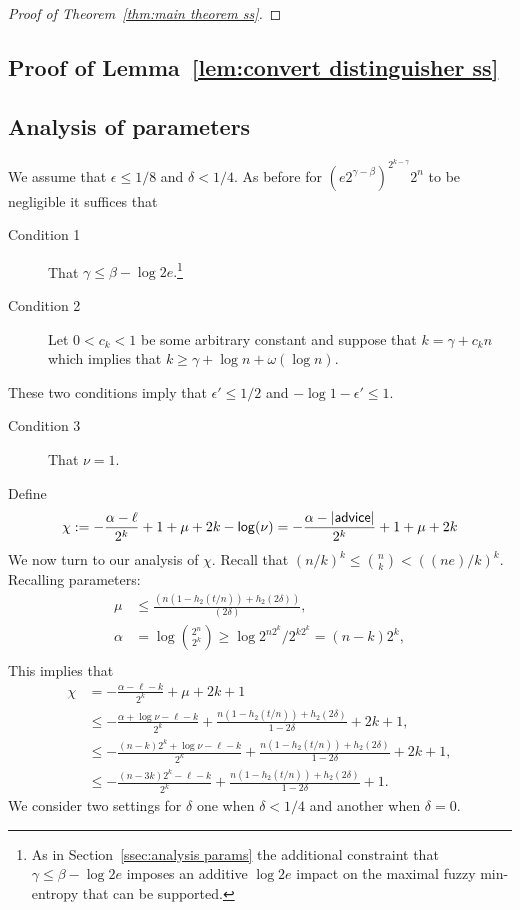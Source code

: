 \begin{proof}[Proof of Theorem~\ref{thm:main theorem ss}]
\end{proof}


\subsection{Proof of Lemma~\ref{lem:convert distinguisher ss}}
\label{ssec:ss proof}


\subsection{Analysis of parameters}
We assume that $\epsilon\le 1/8$ and $\delta<1/4$.  As before for  
$
\left(e2^{\gamma-\beta}\right)^{2^{k-\gamma}}2^n$ to be negligible it suffices that
\begin{description}
\item[Condition 1] That $\gamma \le \beta-\log{2e}.$\footnote{As in Section~\ref{ssec:analysis params} the additional constraint that 
$
\gamma \le \beta - \log{2e}$ 
imposes an additive $\log{2e}$ impact on the maximal fuzzy min-entropy that can be supported. 
}
\item[Condition 2] Let $0<c_k<1$ be some arbitrary constant and suppose that $k= \gamma+c_kn$ which implies that $k\ge \gamma + \log{n+\omega(\log{n})}$.
\end{description}
These two conditions imply that $\epsilon'\le 1/2$ and $-\log{1-\epsilon'}\le 1$.
\begin{description}
\item[Condition 3] That  $\nu = 1$.
\end{description}
Define \[\chi: =-\frac{\alpha-\ell}{2^k}+1+\mu+2k-\mathsf{log}\!\left(\nu\right)=-\frac{\alpha-|{\mathsf{advice}}|}{2^k}+1+\mu+2k\]
We now turn to our analysis of $\chi$.  Recall that $(n/k)^k \le {n\choose k} < ((ne)/k)^k$.  Recalling parameters: 
\begin{align*}
\mu&\le \frac{(n(1-h_2(t/n)) +h_2(2\delta))}{(2\delta)},\\
\alpha &= \log{2^n\choose 2^k} \ge \log{2^{n2^k} /2^{k2^k}} = (n-k)2^k,\\
\end{align*}
This implies that 
\begin{align*}
\chi&= -\frac{\alpha-\ell-k}{2^k} + \mu +2k+1\\
&\le  -\frac{\alpha +\log{\nu}-\ell-k}{2^k} +\frac{n(1-h_2(t/n)) +h_2(2\delta)}{1-2\delta}  + 2k+1,\\
&\le - \frac{(n-k)2^k +\log{\nu}-\ell-k}{2^k} +\frac{n(1-h_2(t/n)) +h_2(2\delta)}{1-2\delta} + 2k+1,\\
&\le  -\frac{(n-3k)2^k-\ell-k}{2^k} + \frac{n(1-h_2(t/n)) +h_2(2\delta)}{1-2\delta}+1.
\end{align*}
We consider two settings for $\delta$ one when $\delta<1/4$ and another when $\delta=0$.

